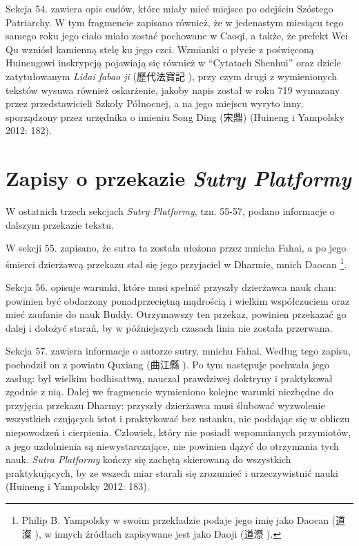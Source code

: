 Sekcja 54. zawiera opis cudów, które miały mieć miejsce po odejściu Szóstego Patriarchy.
W tym fragmencie zapisano również, że w jedenastym miesiącu tego samego roku jego ciało miało zostać pochowane w Caoqi, a także, że prefekt Wei Qu wzniósł kamienną stelę ku jego czci.
Wzmianki o płycie z poświęconą Huinengowi inskrypcją pojawiają się również w ``Cytatach Shenhui'' oraz dziele zatytułowanym \textit{Lidai fabao ji} (歷代法寶記 ), przy czym drugi z wymienionych tekstów wysuwa również oskarżenie, jakoby napis został w roku 719 wymazany przez przedstawicieli Szkoły Północnej, a na jego miejscu wyryto inny, sporządzony przez urzędnika o imieniu Song Ding (宋鼎)
(Huineng i Yampolsky 2012: 182).

\section{Zapisy o przekazie \textit{Sutry Platformy}}
W ostatnich trzech sekcjach \textit{Sutry Platformy}, tzn. 55-57, podano informacje o dalszym przekazie tekstu.

W sekcji 55. zapisano, że sutra ta została ułożona przez mnicha Fahai, a po jego śmierci dzierżawcą przekazu stał się jego przyjaciel w Dharmie, mnich Daocan%
\footnote{Philip B. Yampolsky w swoim przekładzie podaje jego imię jako Daocan (道澯 ), w innych źródłach zapisywane jest jako Daoji (道漈 ).}.

Sekcja 56. opisuje warunki, które musi spełnić przyszły dzierżawca nauk chan: powinien być obdarzony ponadprzeciętną mądrością i wielkim współczuciem oraz mieć zaufanie do nauk Buddy.
Otrzymawszy ten przekaz, powinien przekazać go dalej i dołożyć starań, by w późniejszych czasach linia nie została przerwana.

Sekcja 57. zawiera informacje o autorze sutry, mnichu Fahai. Według tego zapisu, pochodził on z powiatu Quxiang (曲江縣 ).
Po tym następuje pochwała jego zasług: był wielkim bodhisattwą, nauczał prawdziwej doktryny i praktykował zgodnie z nią.
Dalej we fragmencie wymieniono kolejne warunki niezbędne do przyjęcia przekazu Dharmy: przyszły dzierżawca musi ślubować wyzwolenie wszystkich czujących istot i praktykować bez ustanku, nie poddając się w obliczu niepowodzeń i cierpienia.
Człowiek, który nie posiadł wspomnianych przymiotów, a jego uzdolnienia są niewystarczające, nie powinien dążyć do otrzymania tych nauk.
\textit{Sutra Platformy} kończy się zachętą skierowaną do wszystkich praktykujących, by ze wszech miar starali się zrozumieć i urzeczywistnić nauki
(Huineng i Yampolsky 2012: 183).

